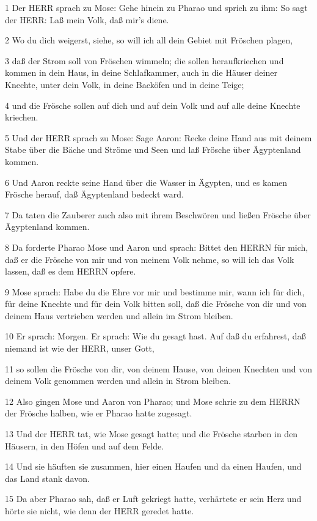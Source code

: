 \par 1 Der HERR sprach zu Mose: Gehe hinein zu Pharao und sprich zu ihm: So sagt der HERR: Laß mein Volk, daß mir's diene.
\par 2 Wo du dich weigerst, siehe, so will ich all dein Gebiet mit Fröschen plagen,
\par 3 daß der Strom soll von Fröschen wimmeln; die sollen heraufkriechen und kommen in dein Haus, in deine Schlafkammer, auch in die Häuser deiner Knechte, unter dein Volk, in deine Backöfen und in deine Teige;
\par 4 und die Frösche sollen auf dich und auf dein Volk und auf alle deine Knechte kriechen.
\par 5 Und der HERR sprach zu Mose: Sage Aaron: Recke deine Hand aus mit deinem Stabe über die Bäche und Ströme und Seen und laß Frösche über Ägyptenland kommen.
\par 6 Und Aaron reckte seine Hand über die Wasser in Ägypten, und es kamen Frösche herauf, daß Ägyptenland bedeckt ward.
\par 7 Da taten die Zauberer auch also mit ihrem Beschwören und ließen Frösche über Ägyptenland kommen.
\par 8 Da forderte Pharao Mose und Aaron und sprach: Bittet den HERRN für mich, daß er die Frösche von mir und von meinem Volk nehme, so will ich das Volk lassen, daß es dem HERRN opfere.
\par 9 Mose sprach: Habe du die Ehre vor mir und bestimme mir, wann ich für dich, für deine Knechte und für dein Volk bitten soll, daß die Frösche von dir und von deinem Haus vertrieben werden und allein im Strom bleiben.
\par 10 Er sprach: Morgen. Er sprach: Wie du gesagt hast. Auf daß du erfahrest, daß niemand ist wie der HERR, unser Gott,
\par 11 so sollen die Frösche von dir, von deinem Hause, von deinen Knechten und von deinem Volk genommen werden und allein in Strom bleiben.
\par 12 Also gingen Mose und Aaron von Pharao; und Mose schrie zu dem HERRN der Frösche halben, wie er Pharao hatte zugesagt.
\par 13 Und der HERR tat, wie Mose gesagt hatte; und die Frösche starben in den Häusern, in den Höfen und auf dem Felde.
\par 14 Und sie häuften sie zusammen, hier einen Haufen und da einen Haufen, und das Land stank davon.
\par 15 Da aber Pharao sah, daß er Luft gekriegt hatte, verhärtete er sein Herz und hörte sie nicht, wie denn der HERR geredet hatte.
